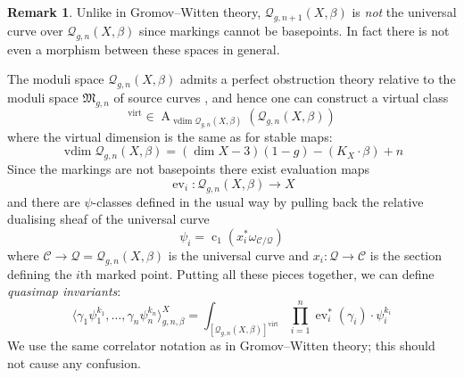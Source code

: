 \documentclass[11pt]{amsart}
\newcommand{\Q}[4]{\mathcal{Q}_{#1,#2}(#3,#4)}
\renewcommand{\to}{\rightarrow}
\newcommand{\MM}{\mathfrak M}
\newcommand{\virt}[1]{[#1]^{\operatorname{virt}}}
\newcommand{\Achow}{\operatorname{A}}
\newcommand{\ev}{\operatorname{ev}}
\newcommand{\om}[1]{\mathcal{#1}}
\theoremstyle{definition}
\theoremstyle{definition}
\newtheorem{remark}[thm]{Remark}
\newcommand{\ilemph}[1]{\emph{#1}}
\begin{document}

\begin{remark} Unlike in Gromov--Witten theory, $\Q{g}{n+1}{X}{\beta}$ is \emph{not} the universal curve over $\Q{g}{n}{X}{\beta}$ since markings cannot be basepoints. In fact there is not even a morphism between these spaces in general.\end{remark}

The moduli space $\Q{g}{n}{X}{\beta}$ admits a perfect obstruction theory relative to the moduli space $\MM_{g,n}$ of source curves \cite[\S 5]{CF-K}, and hence one can construct a virtual class
\begin{equation*} \virt{\Q{g}{n}{X}{\beta}} \in \Achow_{\operatorname{vdim}\Q{g}{n}{X}{\beta}} \left( \Q{g}{n}{X}{\beta} \right) \end{equation*}
where the virtual dimension is the same as for stable maps:
\begin{equation*} \operatorname{vdim}\Q{g}{n}{X}{\beta} = (\dim{X} - 3)(1-g) - (K_X \cdot \beta) + n \end{equation*}
Since the markings are not basepoints there exist evaluation maps
\begin{equation*} \ev_i : \Q{g}{n}{X}{\beta} \to X \end{equation*}
and there are $\psi$-classes defined in the usual way by pulling back the relative dualising sheaf of the universal curve
\begin{equation*} \psi_i = \operatorname{c}_1(x_i^* \omega_{\mathcal{C}/\om{Q}}) \end{equation*}
where $\mathcal{C} \to \om{Q} = \Q{g}{n}{X}{\beta}$ is the universal curve and $x_i : \om{Q} \to \mathcal{C}$ is the section defining the $i$th marked point. Putting all these pieces together, we can define \ilemph{quasimap invariants}:
\begin{equation*} \langle \gamma_1 \psi_1^{k_1} , \ldots, \gamma_n \psi_n^{k_n} \rangle_{g,n,\beta}^X = \int_{\virt{\Q{g}{n}{X}{\beta}}} \prod_{i=1}^n \ev_i^* (\gamma_i) \cdot \psi_i^{k_i} \end{equation*}
We use the same correlator notation as in Gromov--Witten theory; this should not cause any confusion.
\end{document}
